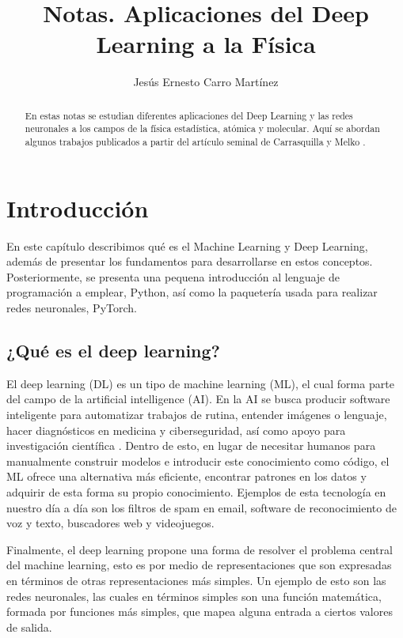 \documentclass[12pt,oneside,openany]{memoir}
\title{Notas. Aplicaciones del Deep Learning a la Física}
\author{Jesús Ernesto Carro Martínez}
\begin{document}
\maketitle

\begin{abstract}
En estas notas se estudian diferentes aplicaciones del Deep Learning y las redes neuronales a los campos de la física estadística, atómica y molecular. Aquí se abordan algunos trabajos publicados a partir del artículo seminal de Carrasquilla y Melko \cite{Car17}.
\end{abstract}

\newpage

\chapter{Introducción}

En este capítulo describimos qué es el Machine Learning y Deep Learning, además de presentar los fundamentos para desarrollarse en estos conceptos. Posteriormente, se presenta una pequena introducción al lenguaje de programación a emplear, Python, así como la paquetería usada para realizar redes neuronales, PyTorch. 

\section{¿Qué es el deep learning?}

El deep learning (DL) es un tipo de machine learning (ML), el cual forma parte del campo de la artificial intelligence (AI). En la AI se busca producir software inteligente para automatizar trabajos de rutina, entender imágenes o lenguaje, hacer diagnósticos en medicina y ciberseguridad, así como apoyo para investigación científica \cite{Nil09}. Dentro de esto, en lugar de necesitar humanos para manualmente construir modelos e introducir este conocimiento como código, el ML ofrece una alternativa más eficiente, encontrar patrones en los datos y adquirir de esta forma su propio conocimiento. Ejemplos de esta tecnología en nuestro día a día son los filtros de spam en email, software de reconocimiento de voz y texto, buscadores web y videojuegos.

Finalmente, el deep learning propone una forma de resolver el problema central del machine learning, esto es por medio de representaciones que son expresadas en términos de otras representaciones más simples. Un ejemplo de esto son las redes neuronales, las cuales en términos simples son una función matemática, formada por funciones más simples, que mapea alguna entrada a ciertos valores de salida. 
\end{document}
